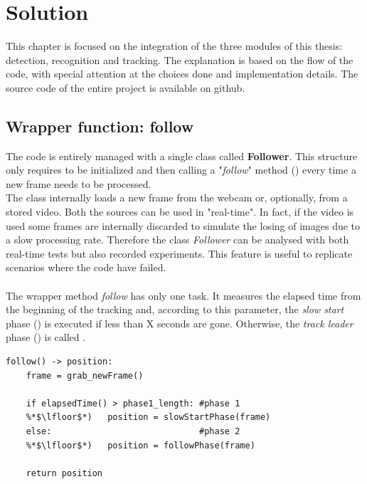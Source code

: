 \chapter{Solution} \label{cha:solution}
This chapter is focused on the integration of the three modules of this thesis: detection, recognition and tracking. The explanation is based on the flow of the code, with special attention at the choices done and implementation details. The source code of the entire project is available on github\cite{projectSourceCode}.

\section{Wrapper function: follow} \label{sec:follow}
The code is entirely managed with a single class called \textbf{Follower}. This structure only requires to be initialized and then calling a "\textit{follow}" method () every time a new frame needs to be processed.\\
The class internally loads a new frame  from the webcam or, optionally, from a stored video. Both the sources can be used in "real-time". In fact, if the video is used some frames are internally discarded to simulate the losing of images due to a slow processing rate. Therefore the class \textit{Follower} can be analysed with both real-time tests but also recorded experiments. This feature is useful to replicate scenarios where the code have failed.\\
\\
The wrapper method \textit{follow} has only one task. It measures the elapsed time from the beginning of the tracking  and, according to this parameter, the \textit{slow start} phase () is executed   if less than X seconds are gone. Otherwise, the \textit{track leader} phase () is called .

\begin{lstlisting}[captionpos=b, 
	caption={It is the pseudocode of the wrapper function that should grab the new incoming frames and redirect them to the first or second phase according to the time elapsed from the tracking begin.}, 
	label=alg:follow
	]
follow() -> position:
	frame = grab_newFrame()
	
	if elapsedTime() > phase1_length: #phase 1
	%*$\lfloor$*)	position = slowStartPhase(frame)
	else:							  #phase 2
	%*$\lfloor$*)	position = followPhase(frame)

	return position
\end{lstlisting}


